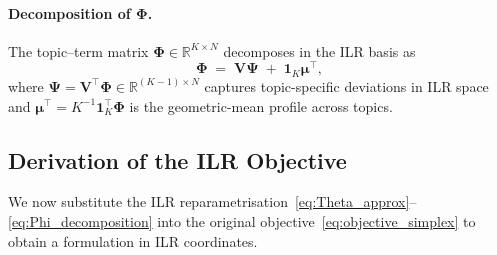 \documentclass{article}
\begin{document}
\paragraph{Decomposition of $\boldsymbol{\Phi}$.}
The topic--term matrix $\boldsymbol{\Phi}\in\mathbb{R}^{K\times N}$
decomposes in the ILR basis as
\begin{equation}
  \boldsymbol{\Phi}
  \;=\;
  \mathbf{V}\boldsymbol{\Psi}
  \;+\;
  \mathbf{1}_K\boldsymbol{\mu}^{\!\top},
  \label{eq:Phi_decomposition}
\end{equation}
where
$\boldsymbol{\Psi}=\mathbf{V}^{\!\top}\boldsymbol{\Phi}
 \in\mathbb{R}^{(K{-}1)\times N}$
captures topic-specific deviations in ILR space and
$\boldsymbol{\mu}^{\!\top}=K^{-1}\mathbf{1}_K^{\!\top}\boldsymbol{\Phi}$
is the geometric-mean profile across topics.


\subsection{Derivation of the ILR Objective}
\label{subsec:ilr_derivation}

We now substitute the ILR
reparametrisation~\eqref{eq:Theta_approx}--\eqref{eq:Phi_decomposition}
into the original objective~\eqref{eq:objective_simplex} to obtain a
formulation in ILR coordinates.
\end{document}
